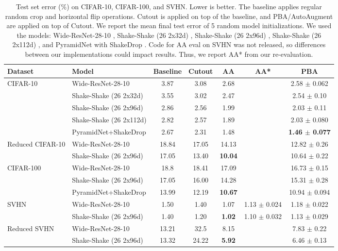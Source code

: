 \documentclass{article}
\begin{document}
\begin{table*}[t]
\caption{Test set error (\%) on CIFAR-10, CIFAR-100, and SVHN. Lower is better. The baseline applies regular random crop and horizontal flip operations. Cutout is applied on top of the baseline, and PBA/AutoAugment are applied on top of Cutout. We report the mean final test error of 5 random model initializations. We used the models: Wide-ResNet-28-10 \cite{wrn}, Shake-Shake (26 2x32d) \cite{shake-shake}, Shake-Shake (26 2x96d) \cite{shake-shake}, Shake-Shake (26 2x112d) \cite{shake-shake}, and PyramidNet with ShakeDrop \cite{pyramidnet, shake-drop}. Code for AA eval on SVHN was not released, so differences between our implementations could impact results. Thus, we report AA* from our re-evaluation.}
\label{table-merged}
\vskip 0.15in
\begin{center}
\begin{small}
\begin{tabular}{llccccc}
\toprule
Dataset & Model & Baseline & Cutout & AA & AA* & PBA  \\
\midrule
CIFAR-10 & Wide-ResNet-28-10     &   3.87 & 3.08 & 2.68 & & 2.58 $\pm$ 0.062  \\
 & Shake-Shake (26 2x32d) & 3.55 & 3.02 & 2.47&  & 2.54 $\pm$ 0.10  \\
 & Shake-Shake (26 2x96d) & 2.86 & 2.56 & 1.99& & 2.03 $\pm$ 0.11 \\
 & Shake-Shake (26 2x112d) & 2.82 & 2.57 & 1.89& & 2.03  $\pm$ 0.080  \\
 & PyramidNet+ShakeDrop   & 2.67 & 2.31 & 1.48& & \textbf{1.46  $\pm$ 0.077} \\
\midrule
Reduced CIFAR-10 & Wide-ResNet-28-10     &   18.84 & 17.05 & 14.13& & 12.82 $\pm$ 0.26  \\
& Shake-Shake (26 2x96d) & 17.05 & 13.40 & \textbf{10.04} & & 10.64 $\pm$ 0.22 \\
\midrule
CIFAR-100 & Wide-ResNet-28-10     &  18.8 & 18.41 & 17.09 & & 16.73 $\pm$ 0.15  \\
& Shake-Shake (26 2x96d) & 17.05 & 16.00 & 14.28 & & 15.31 $\pm$ 0.28 \\
& PyramidNet+ShakeDrop & 13.99 & 12.19 & \textbf{10.67} & & 10.94 $\pm$ 0.094 \\
\midrule
SVHN & Wide-ResNet-28-10 & 1.50 & 1.40 & 1.07 & 1.13 $\pm$ 0.024 & 1.18 $\pm$ 0.022 \\
& Shake-Shake (26 2x96d) & 1.40 & 1.20 & \textbf{1.02} & 1.10 $\pm$ 0.032 & 1.13 $\pm$ 0.029 \\
\midrule
Reduced SVHN & Wide-ResNet-28-10 & 13.21 & 32.5 & 8.15 & & 7.83 $\pm$ 0.22 \\
& Shake-Shake (26 2x96d) & 13.32 & 24.22 & \textbf{5.92} & & 6.46 $\pm$ 0.13 \\
\bottomrule
\end{tabular}
\end{small}
\end{center}
\vskip -0.1in
\end{table*}
\end{document}
